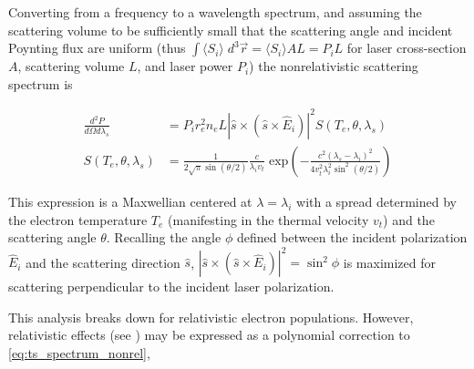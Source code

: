 \noindent Converting from a frequency to a wavelength spectrum, and assuming the scattering volume to be sufficiently small that the scattering angle and incident Poynting flux are uniform (thus $\int \langle S_i \rangle \;d^3\vec{r} = \langle S_i \rangle AL = P_i L$ for laser cross-section $A$, scattering volume $L$, and laser power $P_i$) the nonrelativistic scattering spectrum is


\begin{equation}\label{eq:ts_spectrum_nonrel}
 \begin{aligned}
  \frac{d^2 P}{d\Omega d\lambda_s} &= P_i r_e^2 n_e L \left| \hat{s} \times \left( \hat{s} \times \hat{E}_i \right) \right|^2 S(T_e, \theta, \lambda_s)\\
  S(T_e,\theta,\lambda_s) &= \frac{1}{2\sqrt{\pi} \sin(\theta/2)} \frac{c}{\lambda_i v_t} \;\mbox{exp}\left(-\frac{c^2 (\lambda_s - \lambda_i)^2}{4v_t^2 \lambda_i^2 \sin^2 (\theta/2)}\right)
 \end{aligned}
\end{equation}

\noindent This expression is a Maxwellian centered at $\lambda = \lambda_i$ with a spread determined by the electron temperature $T_e$ (manifesting in the thermal velocity $v_t$) and the scattering angle $\theta$.  Recalling the angle $\phi$ defined between the incident polarization $\hat{E}_i$ and the scattering direction $\hat{s}$, $\left|\hat{s} \times \left( \hat{s} \times \hat{E}_i \right) \right|^2 = \sin^2 \phi$ is maximized for scattering perpendicular to the incident laser polarization.

This analysis breaks down for relativistic electron populations.  However, relativistic effects (see \cite[\S 9]{Sheffield}) may be expressed as a polynomial correction to \cref{eq:ts_spectrum_nonrel},



